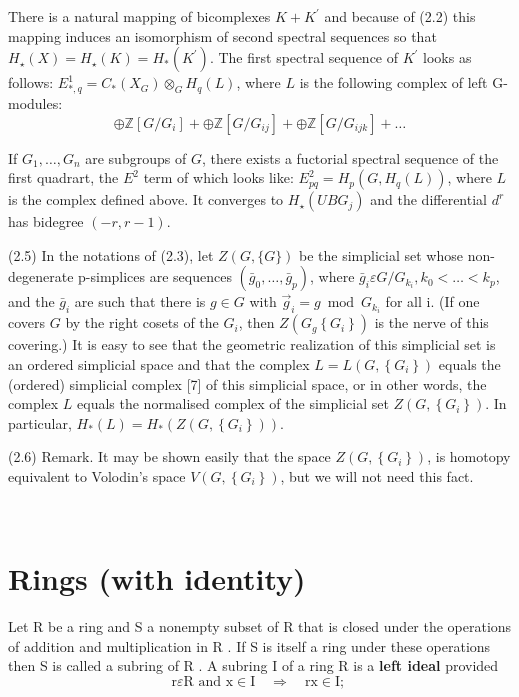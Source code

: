 There is a natural mapping of bicomplexes $K+K^{\prime}$ and because of (2.2) this mapping induces an isomorphism of second spectral sequences so that $H_{\star}(X)=H_{\star}(K)=H_*\left(K^{\prime}\right)$. The first spectral sequence of $K^{\prime}$ looks as follows: $E_{*, q}^1=C_*\left(X_G\right) \otimes_G H_q(L)$, where $L$ is the following complex of left G-modules:
$$
\oplus \mathbb{Z}\left[G / G_i\right]+\oplus \mathbb{Z}\left[G / G_{i j}\right]+\oplus \mathbb{Z}\left[G / G_{i j k}\right]+\ldots
$$


\begin{prop}
If $G_1, \ldots, G_n$ are subgroups of $G$, there exists a fuctorial spectral sequence of the first quadrart, the $E^2$ term of which looks like: $E_{p q}^2=H_p\left(G, H_q(L)\right)$, where $L$ is the complex defined above. It converges to $H_{\star}\left(U B G_j\right)$ and the differential $d^r$ has bidegree $(-r, r-1)$.   
\end{prop}

(2.5) In the notations of (2.3), let $Z(G,\{G\})$ be the simplicial set whose non-degenerate p-simplices are sequences $\left(\bar{g}_0, \ldots, \bar{g}_p\right)$, where $\bar{g}_i \varepsilon G / G_{k_i}, k_0<\ldots<k_p$, and the $\bar{g}_i$ are such that there is $g \in G$ with $\vec{g}_i=g \bmod G_{k_i}$ for all i. (If one covers $G$ by the right cosets of the $G_i$, then $Z\left(G_g\left\{G_i\right\}\right)$ is the nerve of this covering.) It is easy to see that the geometric realization of this simplicial set is an ordered simplicial space and that the complex $L=L\left(G,\left\{G_i\right\}\right)$ equals the (ordered) simplicial complex [7] of this simplicial space, or in other words, the complex $L$ equals the normalised complex of the simplicial set $Z\left(G,\left\{G_i\right\}\right)$. In particular, $H_*(L)=H_*\left(Z\left(G,\left\{G_i\right\}\right)\right)$.

(2.6) Remark. It may be shown easily that the space $Z\left(G,\left\{G_i\right\}\right)$, is homotopy equivalent to Volodin's space $V\left(G,\left\{G_i\right\}\right)$, but we will not need this fact.

\


\chapter{Rings (with identity)}

Let R be a ring and S a nonempty subset of R that is closed under the operations of addition and multiplication in R . If S is itself a ring under these operations then S is called a subring of R . A subring I of a ring R is a \textbf{left ideal} provided
$$
\mathrm{r} \varepsilon \mathrm{R} \text { and } \mathrm{x} \in \mathrm{I} \quad \Rightarrow \quad \mathrm{rx} \in \mathrm{I} \text {; }
$$

